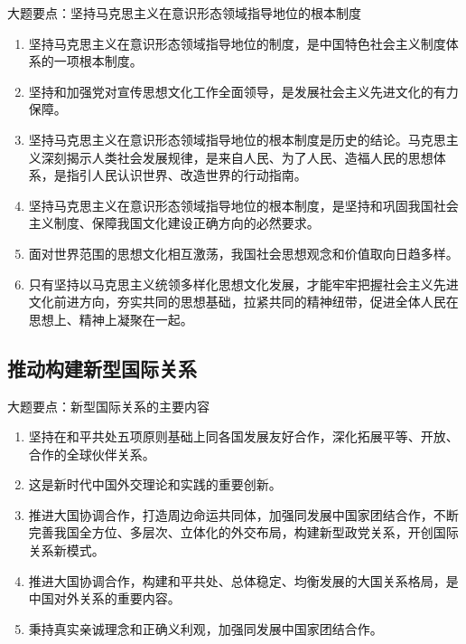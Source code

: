 \documentclass[12pt,a4paper]{ctexart}
\begin{document}
\begin{greenlinebox}{大题要点：坚持马克思主义在意识形态领域指导地位的根本制度}
\begin{enumerate}
  \item 坚持马克思主义在意识形态领域指导地位的制度，是中国特色社会主义制度体系的一项根本制度。
  \item 坚持和加强党对宣传思想文化工作全面领导，是发展社会主义先进文化的有力保障。
  \item 坚持马克思主义在意识形态领域指导地位的根本制度是历史的结论。马克思主义深刻揭示人类社会发展规律，是来自人民、为了人民、造福人民的思想体系，是指引人民认识世界、改造世界的行动指南。
  \item 坚持马克思主义在意识形态领域指导地位的根本制度，是坚持和巩固我国社会主义制度、保障我国文化建设正确方向的必然要求。
  \item 面对世界范围的思想文化相互激荡，我国社会思想观念和价值取向日趋多样。
  \item 只有坚持以马克思主义统领多样化思想文化发展，才能牢牢把握社会主义先进文化前进方向，夯实共同的思想基础，拉紧共同的精神纽带，促进全体人民在思想上、精神上凝聚在一起。
\end{enumerate}
\end{greenlinebox}

\subsection{推动构建新型国际关系}

\begin{greenlinebox}{大题要点：新型国际关系的主要内容}
\begin{enumerate}
  \item 坚持在和平共处五项原则基础上同各国发展友好合作，深化拓展平等、开放、合作的全球伙伴关系。
  \item 这是新时代中国外交理论和实践的重要创新。
  \item 推进大国协调合作，打造周边命运共同体，加强同发展中国家团结合作，不断完善我国全方位、多层次、立体化的外交布局，构建新型政党关系，开创国际关系新模式。
  \item 推进大国协调合作，构建和平共处、总体稳定、均衡发展的大国关系格局，是中国对外关系的重要内容。
  \item 秉持真实亲诚理念和正确义利观，加强同发展中国家团结合作。
\end{enumerate}
\end{greenlinebox}
\end{document}
